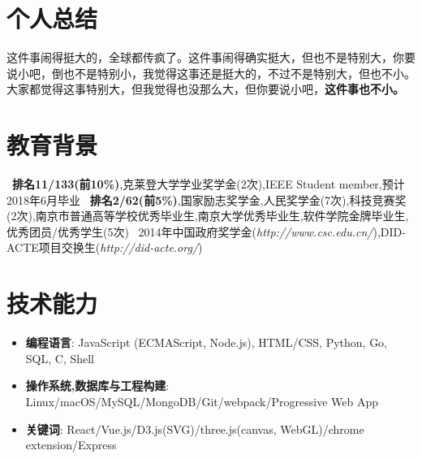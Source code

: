 \documentclass{resume}
\begin{document}


 
\section{个人总结}
这件事闹得挺大的，全球都传疯了。这件事闹得确实挺大，但也不是特别大，你要说小吧，倒也不是特别小，我觉得这事还是挺大的，不过不是特别大，但也不小。大家都觉得这事特别大，但我觉得也没那么大，但你要说小吧，\textbf{这件事也不小。}

\section{教育背景}
\ \textbf{排名11/133(前10\%)},克莱登大学学业奖学金(2次),IEEE Student member,预计2018年6月毕业
\ \textbf{排名2/62(前5\%)},国家励志奖学金,人民奖学金(7次),科技竞赛奖(2次),南京市普通高等学校优秀毕业生,南京大学优秀毕业生,软件学院金牌毕业生,优秀团员/优秀学生(5次)
\ 2014年中国政府奖学金(\textit{http://www.csc.edu.cn/}),DID-ACTE项目交换生(\textit{http://did-acte.org/})

\section{技术能力}
\begin{itemize}[parsep=0.2ex]
  \item \textbf{编程语言}: JavaScript (ECMAScript, Node.js), HTML/CSS, Python, Go, SQL, C, Shell
  \item \textbf{操作系统,数据库与工程构建}: Linux/macOS/MySQL/MongoDB/Git/webpack/Progressive Web App
  \item \textbf{关键词}: React/Vue.js/D3.js(SVG)/three.js(canvas, WebGL)/chrome extension/Express
\end{itemize}
\end{document}
